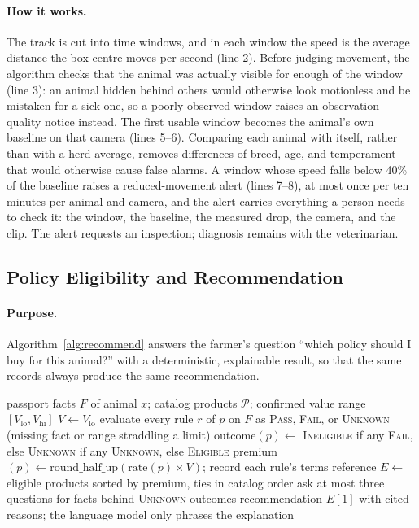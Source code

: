 \documentclass[11pt,letterpaper]{article}
\begin{document}
\paragraph{How it works.} The track is cut into time windows, and in each window the speed is the average distance the box centre moves per second (line 2). Before judging movement, the algorithm checks that the animal was actually visible for enough of the window (line 3): an animal hidden behind others would otherwise look motionless and be mistaken for a sick one, so a poorly observed window raises an observation-quality notice instead. The first usable window becomes the animal's own baseline on that camera (lines 5--6). Comparing each animal with itself, rather than with a herd average, removes differences of breed, age, and temperament that would otherwise cause false alarms. A window whose speed falls below 40\% of the baseline raises a reduced-movement alert (lines 7--8), at most once per ten minutes per animal and camera, and the alert carries everything a person needs to check it: the window, the baseline, the measured drop, the camera, and the clip. The alert requests an inspection; diagnosis remains with the veterinarian.

\subsection{Policy Eligibility and Recommendation}

\paragraph{Purpose.} Algorithm~\ref{alg:recommend} answers the farmer's question ``which policy should I buy for this animal?'' with a deterministic, explainable result, so that the same records always produce the same recommendation.

\begin{algorithm}[H]
\caption{Policy eligibility and recommendation}
\label{alg:recommend}
\begin{algorithmic}[1]
\Require passport facts $F$ of animal $x$; catalog products $\mathcal{P}$; confirmed value range $[V_{\text{lo}}, V_{\text{hi}}]$
\State $V \gets V_{\text{lo}}$ 
  \State evaluate every rule $r$ of $p$ on $F$ as \textsc{Pass}, \textsc{Fail}, or \textsc{Unknown} (missing fact or range straddling a limit)
  \State outcome$(p) \gets$ \textsc{Ineligible} if any \textsc{Fail}, else \textsc{Unknown} if any \textsc{Unknown}, else \textsc{Eligible}
  \State premium$(p) \gets \mathrm{round\_half\_up}(\mathrm{rate}(p) \times V)$; record each rule's terms reference
\EndFor
\State $E \gets$ eligible products sorted by premium, ties in catalog order
\State ask at most three questions for facts behind \textsc{Unknown} outcomes
\State \Return recommendation $E[1]$ with cited reasons; the language model only phrases the explanation
\end{algorithmic}
\end{algorithm}
\end{document}
